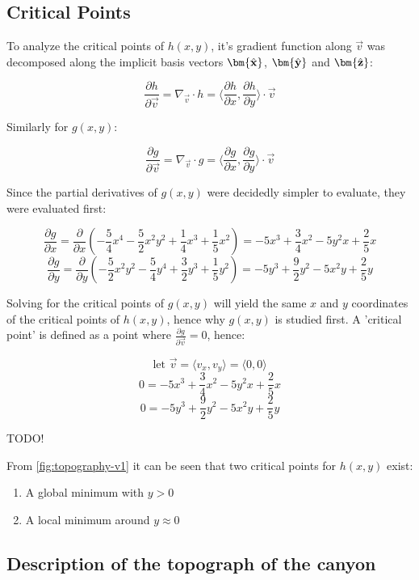 \documentclass{article}
\DeclareRobustCommand{\uvec}[1]{{%
  \ifcsname uvec#1\endcsname
     \csname uvec#1\endcsname
   \else
    \bm{\hat{\mathbf{#1}}}%
   \fi
}}
\begin{document}
\subsection{Critical Points}

To analyze the critical points of $h(x, y)$, it's gradient function along $\vec{v}$ was decomposed along the implicit basis vectors $\uvec{x}$, $\uvec{y}$ and $\uvec{z}$:

\[
\frac{\partial h}{\partial \vec{v}} = {\nabla}_{\vec{v}} \cdot h = \langle \frac{\partial h}{\partial x}, \frac{\partial h}{\partial y} \rangle \cdot \vec{v}
\]

Similarly for $g(x,y)$:

\[
\frac{\partial g}{\partial \vec{v}} = {\nabla}_{\vec{v}} \cdot g = \langle \frac{\partial g}{\partial x}, \frac{\partial g}{\partial y} \rangle \cdot \vec{v}
\]

Since the partial derivatives of $g(x, y)$ were decidedly simpler to evaluate, they were evaluated first:

\[
\frac{\partial g}{\partial x} = \frac{\partial}{\partial x} (-\frac{5}{4}x^{4}-\frac{5}{2}x^{2}y^{2}+\frac{1}{4}x^{3}+\frac{1}{5}x^{2}) = -5x^3 + \frac{3}{4} x^2 -5y^2 x + \frac{2}{5} x
\]
\[
\frac{\partial g}{\partial y} = \frac{\partial}{\partial y} (-\frac{5}{2}x^{2}y^{2}-\frac{5}{4}y^{4}+\frac{3}{2}y^{3}+\frac{1}{5}y^{2}) = - 5y^3 + \frac{9}{2}y^2 -5x^2 y + \frac{2}{5}y
\]

Solving for the critical points of $g(x,y)$ will yield the same $x$ and $y$ coordinates of the critical points of $h(x,y)$, hence why $g(x, y)$ is studied first.
A 'critical point' is defined as a point where $\frac{\partial g}{\partial \vec{v}} = 0$, hence:

\[
\text{let\ } \vec{v} = \langle v_x, v_y \rangle = \langle 0, 0 \rangle
\]
\[
0 = -5x^3 + \frac{3}{4} x^2 -5y^2 x + \frac{2}{5} x
\]
\[
0 = - 5y^3 + \frac{9}{2}y^2 -5x^2 y + \frac{2}{5}y
\]

TODO!

From \ref{fig:topography-v1} it can be seen that two critical points for $h(x,y)$ exist:
\begin{enumerate}
\item A global minimum with $y > 0$
\item A local minimum around $y \approx 0$
\end{enumerate}

\subsection{Description of the topograph of the canyon}
\end{document}
